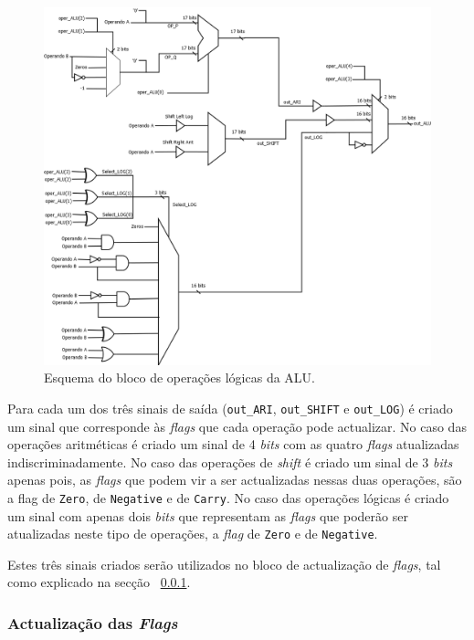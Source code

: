 \documentclass[11pt]{article}
\numberwithin{equation}{section}
\begin{document}
\begin{figure}[H]
	\centering
	\includegraphics[keepaspectratio=true, scale=0.475]{imagens/ALU}
	\caption{Esquema do bloco de operações lógicas da ALU.}
	\vspace{-0.8em}
	\label{fig:ALU}
\end{figure}

Para cada um dos três sinais de saída (\texttt{out\_ARI}, \texttt{out\_SHIFT} e \texttt{out\_LOG}) é criado um sinal que corresponde às \textit{flags} que cada operação pode actualizar. No caso das operações aritméticas é criado um sinal de 4 \textit{bits} com as quatro \textit{flags} atualizadas indiscriminadamente. No caso das operações de \textit{shift} é criado um sinal de 3 \textit{bits} apenas pois, as \textit{flags} que podem vir a ser actualizadas nessas duas operações, são a flag de \texttt{Zero}, de \texttt{Negative} e de \texttt{Carry}. No caso das operações lógicas é criado um sinal com apenas dois \textit{bits} que representam as \textit{flags} que poderão ser atualizadas neste tipo de operações, a \textit{flag} de \texttt{Zero} e de \texttt{Negative}.

Estes três sinais criados serão utilizados no bloco de actualização de \textit{flags}, tal como explicado na secção ~\ref{subsec:act-flags}.

\subsubsection{Actualização das \textit{Flags}}
\label{subsec:act-flags}
\end{document}
